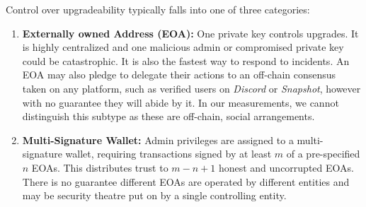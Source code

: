 Control over upgradeability typically falls into one of three categories: 


\begin{enumerate}
\item \textbf{Externally owned Address (EOA):}
One private key controls upgrades. It is highly centralized and one malicious admin or compromised private key could be catastrophic. It is also the fastest way to respond to incidents. An EOA may also pledge to delegate their actions to an off-chain consensus taken on any platform, such as verified users on \textit{Discord} or \textit{Snapshot}, however with no guarantee they will abide by it. In our measurements, we cannot distinguish this subtype as these are off-chain, social arrangements. 

\item \textbf{Multi-Signature Wallet:}
Admin privileges are assigned to a multi-signature wallet, requiring transactions signed by at least $m$ of a pre-specified $n$ EOAs.   This distributes trust to $m-n+1$ honest and uncorrupted EOAs. There is no guarantee different EOAs are operated by different entities and may be security theatre put on by a single controlling entity.



\end{enumerate}
